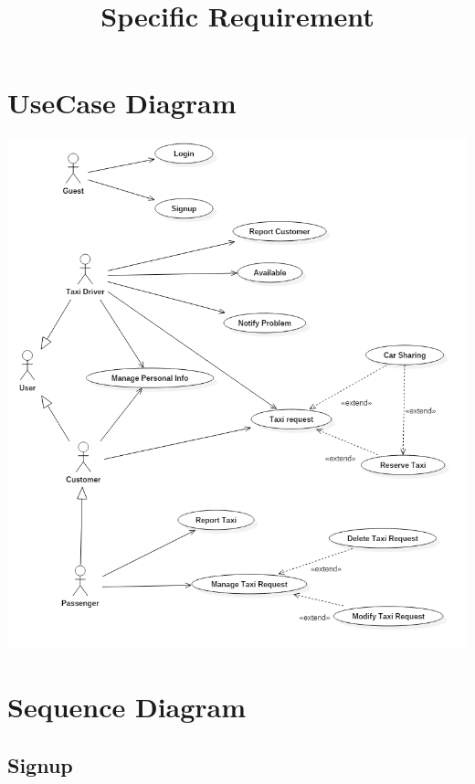 \documentclass[english]{article}
\begin{document}
\title{Specific Requirement}

\section{UseCase Diagram}

\includegraphics[width=\textwidth]{UseCase}

\section{Sequence Diagram}

\subsection{Signup}
\end{document}
